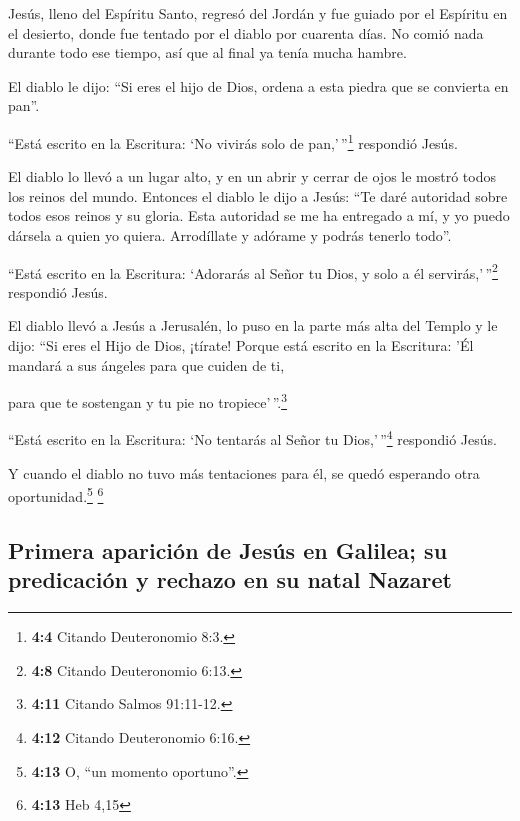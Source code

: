  Jesús, lleno del Espíritu Santo, regresó del Jordán y fue
guiado por el Espíritu en el desierto,  donde fue tentado
por el diablo por cuarenta días. No comió nada durante todo ese tiempo,
así que al final ya tenía mucha hambre.

 El diablo le dijo: ``Si eres el hijo de Dios, ordena a
esta piedra que se convierta en pan''.

 ``Está escrito en la Escritura: `No vivirás solo de
pan,'\,''\footnote{\textbf{4:4} Citando Deuteronomio 8:3.} respondió
Jesús.

 El diablo lo llevó a un lugar alto, y en un abrir y
cerrar de ojos le mostró todos los reinos del mundo. 
Entonces el diablo le dijo a Jesús: ``Te daré autoridad sobre todos esos
reinos y su gloria. Esta autoridad se me ha entregado a mí, y yo puedo
dársela a quien yo quiera.  Arrodíllate y adórame y podrás
tenerlo todo''.

 ``Está escrito en la Escritura: `Adorarás al Señor tu
Dios, y solo a él servirás,'\,''\footnote{\textbf{4:8} Citando
  Deuteronomio 6:13.} respondió Jesús.

 El diablo llevó a Jesús a Jerusalén, lo puso en la parte
más alta del Templo y le dijo: ``Si eres el Hijo de Dios, ¡tírate!
 Porque está escrito en la Escritura: 'Él mandará a sus
ángeles para que cuiden de ti,

 para que te sostengan y tu pie no
tropiece'\,''.\footnote{\textbf{4:11} Citando Salmos 91:11-12.}

 ``Está escrito en la Escritura: `No tentarás al Señor tu
Dios,'\,''\footnote{\textbf{4:12} Citando Deuteronomio 6:16.} respondió
Jesús.

 Y cuando el diablo no tuvo más tentaciones para él, se
quedó esperando otra oportunidad.\footnote{\textbf{4:13} O, ``un momento
  oportuno''.} \footnote{\textbf{4:13} Heb 4,15}

\hypertarget{primera-apariciuxf3n-de-jesuxfas-en-galilea-su-predicaciuxf3n-y-rechazo-en-su-natal-nazaret}{%
\subsection{Primera aparición de Jesús en Galilea; su predicación y
rechazo en su natal
Nazaret}\label{primera-apariciuxf3n-de-jesuxfas-en-galilea-su-predicaciuxf3n-y-rechazo-en-su-natal-nazaret}}

